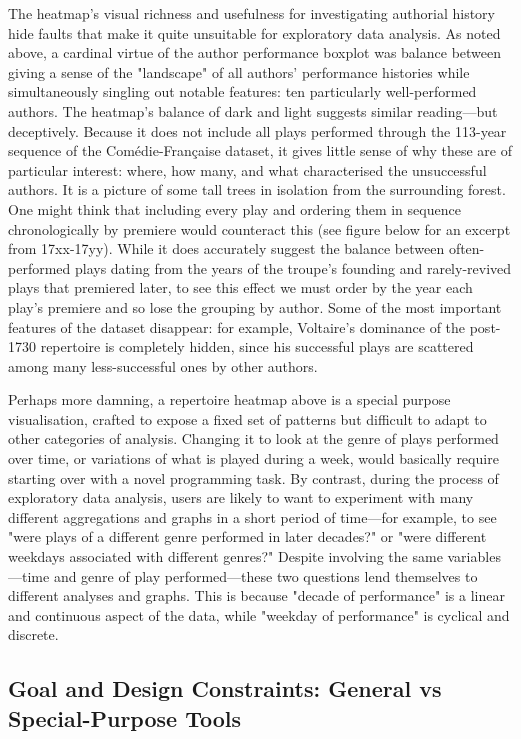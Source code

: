 \documentclass[	DIV=calc,%
							paper=a4,%
							fontsize=11pt,%
							twocolumn]{scrartcl}	 					%
\begin{document}
The heatmap’s visual richness and usefulness for investigating authorial history hide faults that make it quite unsuitable for exploratory data analysis.  As noted above, a cardinal virtue of the author performance boxplot was balance between giving a sense of the "landscape" of all authors’ performance histories while simultaneously singling out notable features: ten particularly well-performed authors.  The heatmap’s balance of dark and light suggests similar reading—but deceptively.  Because it does not include all plays performed through the 113-year sequence of the Comédie-Française dataset, it gives little sense of why these are of particular interest: where, how many, and what characterised the unsuccessful authors.  It is a picture of some tall trees in isolation from the surrounding forest.  One might think that including every play and ordering them in sequence chronologically by premiere would counteract this (see figure below for an excerpt from 17xx-17yy).  While it does accurately suggest the balance between often-performed plays dating from the years of the troupe’s founding and rarely-revived plays that premiered later, to see this effect we must order by the year each play’s premiere and so lose the grouping by author.  Some of the most important features of the dataset disappear: for example, Voltaire’s dominance of the post-1730 repertoire is completely hidden, since his successful plays are scattered among many less-successful ones by other authors.

Perhaps more damning, a repertoire heatmap above is a special purpose visualisation, crafted to expose a fixed set of patterns but difficult to adapt to other categories of analysis.  Changing it to look at the genre of plays performed over time, or variations of what is played during a week, would basically require starting over with a novel programming task.  By contrast, during the process of exploratory data analysis, users are likely to want to experiment with many different aggregations and graphs in a short period of time—for example, to see "were plays of a different genre performed in later decades?" or "were different weekdays associated with different genres?"  Despite involving the same variables—time and genre of play performed—these two questions lend themselves to different analyses and graphs.  This is because "decade of performance" is a linear and continuous aspect of the data, while "weekday of performance" is cyclical and discrete.

\subsection*{Goal and Design Constraints: General vs Special-Purpose Tools}
\end{document}
